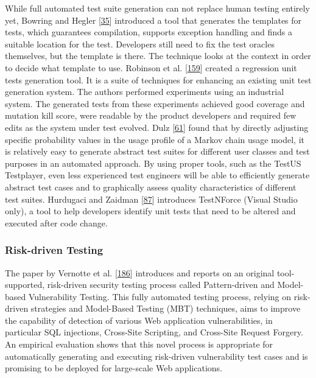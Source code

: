 \documentclass[]{book}
\begin{document}
While full automated test suite generation can not replace human testing
entirely yet, Bowring and Hegler
{[}\protect\hyperlink{ref-bowring2014obsidian}{35}{]} introduced a tool
that generates the templates for tests, which guarantees compilation,
supports exception handling and finds a suitable location for the test.
Developers still need to fix the test oracles themselves, but the
template is there. The technique looks at the context in order to decide
what template to use. Robinson et al.
{[}\protect\hyperlink{ref-robinson2011}{159}{]} created a regression
unit tests generation tool. It is a suite of techniques for enhancing an
existing unit test generation system. The authors performed experiments
using an industrial system. The generated tests from these experiments
achieved good coverage and mutation kill score, were readable by the
product developers and required few edits as the system under test
evolved. Dulz {[}\protect\hyperlink{ref-dulz2013model}{61}{]} found that
by directly adjusting specific probability values in the usage profile
of a Markov chain usage model, it is relatively easy to generate
abstract test suites for different user classes and test purposes in an
automated approach. By using proper tools, such as the TestUS
Testplayer, even less experienced test engineers will be able to
efficiently generate abstract test cases and to graphically assess
quality characteristics of different test suites. Hurdugaci and Zaidman
{[}\protect\hyperlink{ref-hurdugaci2012}{87}{]} introduces TestNForce
(Visual Studio only), a tool to help developers identify unit tests that
need to be altered and executed after code change.

\subsubsection{Risk-driven Testing}\label{risk-driven-testing}

The paper by Vernotte et al.
{[}\protect\hyperlink{ref-vernotte2015}{186}{]} introduces and reports
on an original tool-supported, risk-driven security testing process
called Pattern-driven and Model-based Vulnerability Testing. This fully
automated testing process, relying on risk-driven strategies and
Model-Based Testing (MBT) techniques, aims to improve the capability of
detection of various Web application vulnerabilities, in particular SQL
injections, Cross-Site Scripting, and Cross-Site Request Forgery. An
empirical evaluation shows that this novel process is appropriate for
automatically generating and executing risk-driven vulnerability test
cases and is promising to be deployed for large-scale Web applications.
\end{document}
